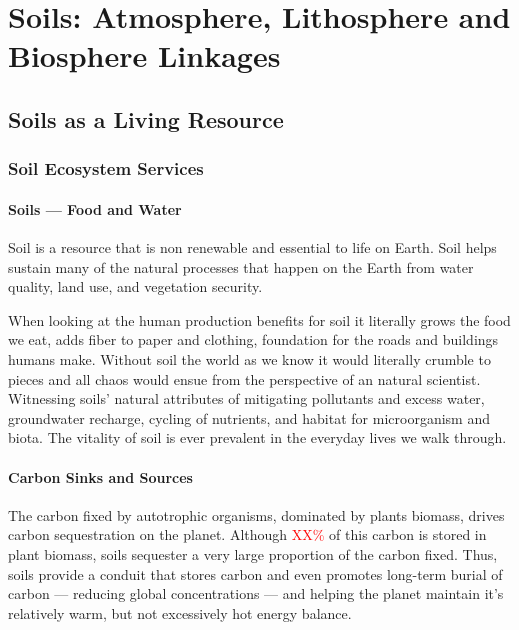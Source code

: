 \chapter[Soils]{Soils: Atmosphere, Lithosphere and Biosphere Linkages}\label{ch:soils}

\section[A Living Resources]{Soils as a Living Resource}

\subsection{Soil Ecosystem Services}

\subsubsection{Soils --- Food and Water}

Soil is a resource that is non renewable and essential to life on Earth. Soil helps sustain many of the natural processes that happen on the Earth from water quality, land use, and vegetation security. 

When looking at the human production benefits for soil it literally grows the food we eat, adds fiber to paper and clothing, foundation for the roads and buildings humans make. Without soil the world as we know it would literally crumble to pieces and all chaos would ensue from the perspective of an natural scientist. Witnessing soils' natural attributes of mitigating pollutants and excess water, groundwater recharge, cycling of nutrients, and habitat for microorganism and biota. The vitality of soil is ever prevalent in the everyday lives we walk through.

\subsubsection{Carbon Sinks and Sources}

The carbon fixed by autotrophic organisms, dominated by plants biomass, drives carbon sequestration on the planet. Although \textcolor{red}{XX\%} of this carbon is stored in plant biomass, soils sequester a very large proportion of the carbon fixed. Thus, soils provide a conduit that stores carbon and even promotes long-term burial of carbon --- reducing global \CO concentrations --- and helping the planet maintain it's relatively warm, but not excessively hot energy balance. 

